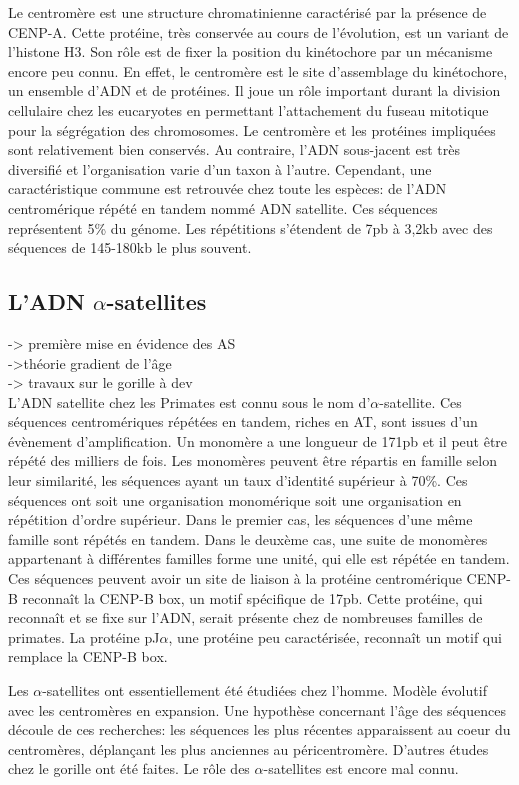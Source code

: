 \documentclass[12pt,a4paper]{article}
\begin{document}
Le centromère est une structure chromatinienne caractérisé par la présence de CENP-A. Cette protéine, très conservée au cours de l'évolution, est un variant de l'histone H3. Son rôle est de fixer la position du kinétochore par un mécanisme encore peu connu. En effet, le centromère est le site d'assemblage du kinétochore, un ensemble d'ADN et de protéines. Il joue un rôle important durant la division cellulaire chez les eucaryotes en permettant l'attachement du fuseau mitotique pour la ségrégation des chromosomes. Le centromère et les protéines impliquées sont relativement bien conservés. Au contraire, l'ADN sous-jacent est très diversifié et l'organisation varie d'un taxon à l'autre. Cependant, une caractéristique commune est retrouvée chez toute les espèces: de l'ADN centromérique répété en tandem nommé ADN satellite. Ces séquences représentent 5\% du génome. Les répétitions s'étendent de 7pb à 3,2kb avec des séquences de 145-180kb le plus souvent.  

\subsection{L'ADN $\alpha$-satellites}
-> première mise en évidence des AS\\
->théorie gradient de l'âge\\
-> travaux sur le gorille à dev\\

L'ADN satellite chez les Primates est connu sous le nom d'$\alpha$-satellite. Ces séquences centromériques répétées en tandem, riches en AT, sont issues d'un évènement d'amplification. Un monomère a une longueur de 171pb et il peut être répété des milliers de fois. Les monomères peuvent être répartis en famille selon leur similarité, les séquences ayant un taux d'identité supérieur à 70\%. Ces séquences ont soit une organisation monomérique soit une organisation en répétition d'ordre supérieur. Dans le premier cas, les séquences d'une même famille sont répétés en tandem. Dans le deuxème cas, une suite de monomères appartenant à différentes familles forme une unité, qui elle est répétée en tandem. Ces séquences peuvent avoir un site de liaison à la protéine centromérique CENP-B reconnaît la CENP-B box, un motif spécifique de 17pb. Cette protéine, qui reconnaît et se fixe sur l'ADN, serait présente chez de nombreuses familles de primates. La protéine pJ$\alpha$, une protéine peu caractérisée, reconnaît un motif qui remplace la CENP-B box.

Les $\alpha$-satellites ont essentiellement été étudiées chez l'homme. Modèle évolutif avec les centromères en expansion. Une hypothèse concernant l'âge des séquences découle de ces recherches: les séquences les plus récentes apparaissent au coeur du centromères, déplançant les plus anciennes au péricentromère. D'autres études chez le gorille ont été faites. Le rôle des $\alpha$-satellites est encore mal connu. 
\end{document}

